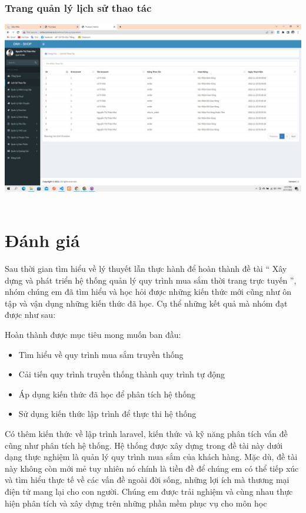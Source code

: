 \documentclass[12pt,a4paper,2sides]{report}
\begin{document}
\subsubsection{Trang quản lý lịch sử thao tác}
    \includegraphics[width=1\linewidth]{lib/results/lichsuthaotac.jpg}\\\vspace*{1cm}  
    \hspace{5cm}{Hình 62. Quản lý lịch sử thao tác}\\
\section{Đánh giá}

Sau thời gian tìm hiểu về lý thuyết lẫn thực hành để hoàn thành đề tài “ Xây dựng và phát triển hệ thống quản lý quy trình mua sắm thời trang trực tuyến ”, nhóm chúng em đã tìm hiểu và học hỏi được những kiến thức mới cũng như ôn tập và vận dụng những kiến thức đã học. Cụ thể những kết quả mà nhóm đạt được như sau:

Hoàn thành được mục tiêu mong muốn ban đầu:
\begin{itemize}
    \item Tìm hiểu về quy trình mua sắm truyền thống
    \item Cải tiến quy trình truyền thống thành quy trình tự động
    \item Áp dụng kiến thức đã học để phân tích hệ thống
    \item Sử dụng kiến thức lập trình để thực thi hệ thống
\end{itemize}

Có thêm kiến thức về lập trình laravel, kiến thức và kỹ năng phân tích vấn đề cũng như phân tích hệ thống. Hệ thống được xây dựng trong đề tài này dưới dạng thực nghiệm là quản lý quy trình mua sắm của khách hàng. Mặc dù, đề tài này không còn mới mẻ tuy nhiên nó chính là tiền đề để chúng em có thể tiếp xúc và tìm hiểu thực tế về các vấn đề ngoài đời sống, những lợi ích mà thương mại điện tử mang lại cho con người. Chúng em được trải nghiệm và cùng nhau thực hiện phân tích và xây dựng trên những phần mềm phục vụ cho môn học
\end{document}
